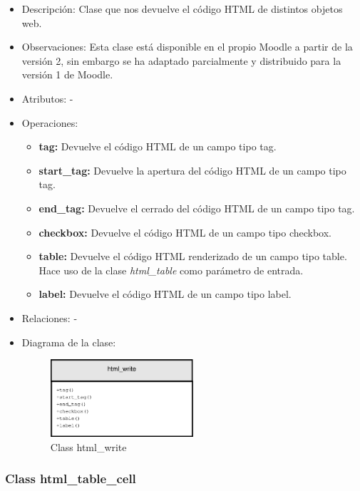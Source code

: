 \begin{itemize}
	\item Descripción: Clase que nos devuelve el código HTML de distintos objetos web.
	\item Observaciones: Esta clase está disponible en el propio Moodle a partir de la versión 2, sin embargo se ha adaptado parcialmente y distribuido para la versión 1 de Moodle.
	\item Atributos: -
	\item Operaciones:
		\begin{itemize}
			\item \textbf{tag:} Devuelve el código HTML de un campo tipo tag.
			\item \textbf{start\_tag:} Devuelve la apertura del código HTML de un campo tipo tag.
			\item \textbf{end\_tag:} Devuelve el cerrado del código HTML de un campo tipo tag.
			\item \textbf{checkbox:} Devuelve el código HTML de un campo tipo checkbox.
			\item \textbf{table:} Devuelve el código HTML renderizado de un campo tipo table. Hace uso de la clase \emph{html\_table} como parámetro de entrada.
			\item \textbf{label:} Devuelve el código HTML de un campo tipo label.
		\end{itemize}
	\item Relaciones: -
	\item Diagrama de la clase:
		\begin{figure}[h]
			\centering
			\includegraphics[width=0.5\textwidth]{./img/html_write.eps}
			\caption{Class html\_write}
		\end{figure}
\end{itemize}

\subsubsection{Class html\_table\_cell}

